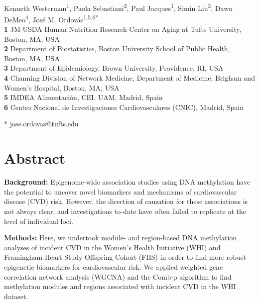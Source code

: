 \documentclass[]{bmcart}
\title{}
\author{}
\date{}
\begin{document}
\begin{flushleft}
{\Large
\textbf{}
}
\newline
\\
Kenneth Westerman\textsuperscript{1},
Paola Sebastiani\textsuperscript{2},
Paul Jacques\textsuperscript{1},
Simin Liu\textsuperscript{3},
Dawn DeMeo\textsuperscript{4},
Jos\'e M. Ordov\'as\textsuperscript{1,5,6*}
\\
\bigskip
\textbf{1} JM-USDA Human Nutrition Research Center on Aging at Tufts University, Boston, MA, USA
\\
\textbf{2} Department of Biostatistics, Boston University School of Public Health, Boston, MA, USA
\\
\textbf{3} Department of Epidemiology, Brown University, Providence, RI, USA
\\
\textbf{4} Channing Division of Network Medicine, Department of Medicine, Brigham and Women's Hospital, Boston, MA, USA
\\
\textbf{5} IMDEA Alimentaci\'on, CEI, UAM, Madrid, Spain
\\
\textbf{6} Centro Nacional de Investigaciones Cardiovasculares (CNIC), Madrid, Spain
\\
\bigskip

* jose.ordovas@tufts.edu

\end{flushleft}

\section{Abstract}\label{abstract}

\textbf{Background:} Epigenome-wide association studies using DNA
methylation have the potential to uncover novel biomarkers and
mechanisms of cardiovascular disease (CVD) risk. However, the direction
of causation for these associations is not always clear, and
investigations to-date have often failed to replicate at the level of
individual loci.

\textbf{Methods:} Here, we undertook module- and region-based DNA
methylation analyses of incident CVD in the Women's Health Initiative
(WHI) and Framingham Heart Study Offspring Cohort (FHS) in order to find
more robust epigenetic biomarkers for cardiovascular risk. We applied
weighted gene correlation network analysis (WGCNA) and the Comb-p
algorithm to find methylation modules and regions associated with
incident CVD in the WHI dataset.
\end{document}
